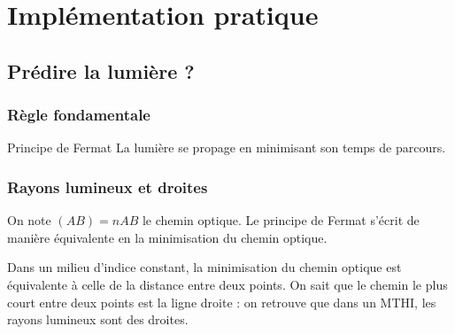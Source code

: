 \documentclass{beamercours}
\begin{document}
\section{Implémentation pratique}
\subsection{Prédire la lumière ?}

\begin{frame}
\frametitle{Règle fondamentale}
\begin{théorème}{Principe de Fermat}{}
La lumière se propage en minimisant son temps de parcours.
\end{théorème}
\end{frame}

\begin{frame}
\frametitle{Rayons lumineux et droites}
On note $(AB) = nAB$ le chemin optique. Le principe de Fermat s'écrit de manière équivalente en la minimisation du chemin optique.\\
\begin{remarque}{}{}
	Dans un milieu d'indice constant, la minimisation du chemin optique est équivalente à celle de la distance entre deux points. On sait que le chemin le plus court entre deux points est la ligne droite : on retrouve que dans un MTHI, les rayons lumineux sont des droites.
\end{remarque}
\end{frame}
\end{document}
